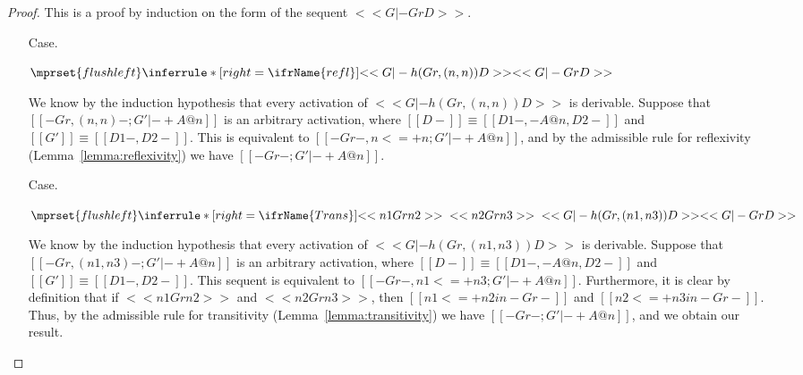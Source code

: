   \begin{proof}
  This is a proof by induction on the form of the sequent $<<G |- Gr D>>$.

  \begin{itemize}
  \item[Case.]\ \\ 
    \begin{center}
      \begin{math}
        $$\mprset{flushleft}
        \inferrule* [right=\ifrName{refl}] {
          <<G |- h(Gr,(n,n)) D>>
        }{<<G |- Gr D>>}
      \end{math}
    \end{center}
    We know by the induction hypothesis that every activation of $<<G |- h(Gr,(n,n)) D>>$ is derivable.  
    Suppose that $[[-Gr,(n,n)- ; G' |- + A @ n]]$ is an arbitrary activation, where
    $[[{D}-]] \equiv [[{D1}-,-A@n,{D2}-]]$ and $[[G']] \equiv [[{D1}-,{D2}-]]$.
    This is equivalent to $[[-Gr-, n <=+ n ; G' |- + A @ n]]$, and 
    by the admissible rule for reflexivity (Lemma~\ref{lemma:reflexivity}) we have 
    $[[-Gr- ; G' |- + A @ n]]$.

  \item[Case.]\ \\ 
    \begin{center}
      \begin{math}
        $$\mprset{flushleft}
        \inferrule* [right=\ifrName{Trans}] {
          <<n1 Gr n2>>
          \\\\
              <<n2 Gr n3>>
              \\\\
              <<G |- h(Gr,(n1,n3)) D>>
        }{<<G |- Gr D>>}
      \end{math}
    \end{center}
    We know by the induction hypothesis that every activation of $<<G |- h(Gr,(n1,n3)) D>>$ is derivable.  
    Suppose that $[[-Gr,(n1,n3)- ; G' |- + A @ n]]$ is an arbitrary activation, where
    $[[{D}-]] \equiv [[{D1}-,-A@n,{D2}-]]$ and $[[G']] \equiv [[{D1}-,{D2}-]]$.  This sequent
    is equivalent to $[[-Gr-,n1 <=+ n3 ; G' |- + A @ n]]$.  Furthermore, it is clear by definition that
    if $<<n1 Gr n2>>$ and $<<n2 Gr n3>>$, then $[[n1 <=+ n2 in -Gr-]]$ and $[[n2 <=+ n3 in -Gr-]]$.  Thus,
    by the admissible rule for transitivity (Lemma~\ref{lemma:transitivity}) we have $[[-Gr- ; G' |- + A @ n]]$,
    and we obtain our result.
    


\end{itemize}
\end{proof}
